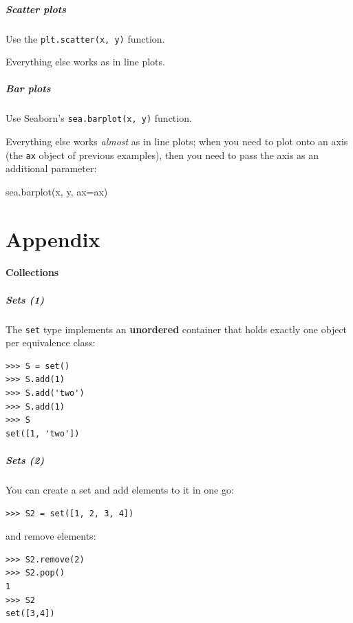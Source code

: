 \documentclass[english,serif,mathserif,xcolor=pdftex,dvipsnames,table]{beamer}
\begin{document}
\begin{frame}
  \frametitle{Scatter plots}

  Use the \texttt{plt.scatter(x, y)} function.

  \+
  Everything else works as in line plots.
\end{frame}


\begin{frame}[fragile]
  \frametitle{Bar plots}

  Use Seaborn's \texttt{sea.barplot(x, y)} function.

  \+
  Everything else works \emph{almost} as in line plots; when you need to plot
  onto an axis (the \texttt{ax} object of previous examples), then you need to
  pass the axis as an additional parameter:
\begin{semiverbatim}
sea.barplot(x, y, ax=ax)
\end{semiverbatim}
\end{frame}


\part{Appendix}

\subsection{Collections}


\begin{frame}[fragile]
  \frametitle{Sets (1)} The \texttt{set} type implements an
  \textbf{unordered} container that holds exactly one object per
  equivalence class:
\begin{lstlisting}
>>> S = set()
>>> S.add(1)
>>> S.add('two')
>>> S.add(1)
>>> S
set([1, 'two'])
\end{lstlisting}

\end{frame}


\begin{frame}[fragile]
  \frametitle{Sets (2)}
You can create a set and add elements to it in one go:
\begin{lstlisting}
>>> S2 = set([1, 2, 3, 4])
\end{lstlisting}

and remove elements:

\begin{lstlisting}
>>> S2.remove(2)
>>> S2.pop()
1
>>> S2
set([3,4])
\end{lstlisting}
\end{frame}
\end{document}
